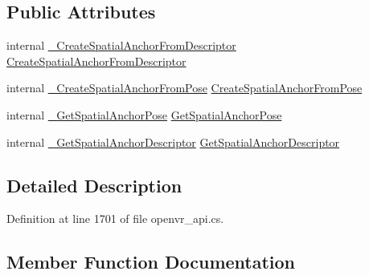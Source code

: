 \subsection*{Public Attributes}
\begin{DoxyCompactItemize}
\item 
internal \mbox{\hyperlink{struct_valve_1_1_v_r_1_1_i_v_r_spatial_anchors_ab4d806db18bce645affea7c6ea454059}{\+\_\+\+Create\+Spatial\+Anchor\+From\+Descriptor}} \mbox{\hyperlink{struct_valve_1_1_v_r_1_1_i_v_r_spatial_anchors_a2bc2a5cbcd94e73c700296c719887af4}{Create\+Spatial\+Anchor\+From\+Descriptor}}
\item 
internal \mbox{\hyperlink{struct_valve_1_1_v_r_1_1_i_v_r_spatial_anchors_a62e9fc61756a4d44558e01efefa17330}{\+\_\+\+Create\+Spatial\+Anchor\+From\+Pose}} \mbox{\hyperlink{struct_valve_1_1_v_r_1_1_i_v_r_spatial_anchors_a4f4aad5431055b8ea6db276a1f143d14}{Create\+Spatial\+Anchor\+From\+Pose}}
\item 
internal \mbox{\hyperlink{struct_valve_1_1_v_r_1_1_i_v_r_spatial_anchors_a77ab8b9b1a7b448eab589d2d84b43ca5}{\+\_\+\+Get\+Spatial\+Anchor\+Pose}} \mbox{\hyperlink{struct_valve_1_1_v_r_1_1_i_v_r_spatial_anchors_ac27617bf362509c867246ac03560eafe}{Get\+Spatial\+Anchor\+Pose}}
\item 
internal \mbox{\hyperlink{struct_valve_1_1_v_r_1_1_i_v_r_spatial_anchors_aaf6ca9028d56903fe2a6ef154ae4dcab}{\+\_\+\+Get\+Spatial\+Anchor\+Descriptor}} \mbox{\hyperlink{struct_valve_1_1_v_r_1_1_i_v_r_spatial_anchors_afdb3e3da5cafa105fcb162f90c1c9041}{Get\+Spatial\+Anchor\+Descriptor}}
\end{DoxyCompactItemize}


\subsection{Detailed Description}


Definition at line 1701 of file openvr\+\_\+api.\+cs.



\subsection{Member Function Documentation}
\mbox{\label{struct_valve_1_1_v_r_1_1_i_v_r_spatial_anchors_ab4d806db18bce645affea7c6ea454059}} 
